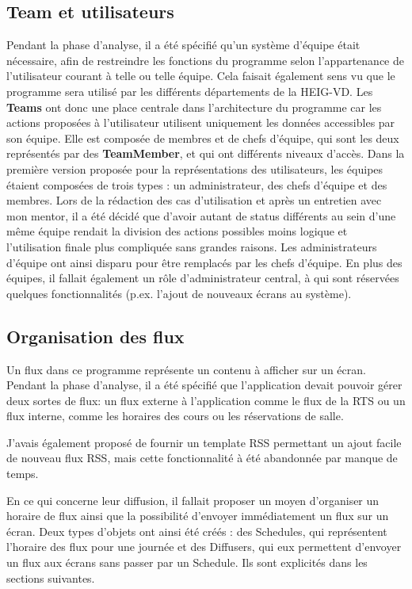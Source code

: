 \documentclass[french]{article}
\begin{document}
\subsection{Team et utilisateurs}
Pendant la phase d'analyse, il a été spécifié qu'un système d'équipe était nécessaire, afin de restreindre les fonctions du programme selon l'appartenance de l'utilisateur courant à telle ou telle équipe. Cela faisait également sens vu que le programme sera utilisé par les différents départements de la HEIG-VD.\newline
Les \textbf{Teams} ont donc une place centrale dans l'architecture du programme car les actions proposées à l'utilisateur utilisent uniquement les données accessibles par son équipe. Elle est composée de membres et de chefs d'équipe, qui sont les deux représentés par des \textbf{TeamMember}, et qui ont différents niveaux d'accès. \newline
Dans la première version proposée pour la représentations des utilisateurs, les équipes étaient composées de trois types : un administrateur, des chefs d'équipe et des membres. Lors de la rédaction des cas d'utilisation et après un entretien avec mon mentor, il a été décidé que d'avoir autant de status différents au sein d'une même équipe rendait la division des actions possibles moins logique et l'utilisation finale plus compliquée sans grandes raisons. Les administrateurs d'équipe ont ainsi disparu pour être remplacés par les chefs d'équipe.\newline
En plus des équipes, il fallait également un rôle d'administrateur central, à qui sont réservées quelques fonctionnalités (p.ex. l'ajout de nouveaux écrans au système).

\subsection{Organisation des flux}

Un flux dans ce programme représente un contenu à afficher sur un écran. Pendant la phase d'analyse, il a été spécifié que l'application devait pouvoir gérer deux sortes de flux: un flux externe à l'application comme le flux de la RTS ou un flux interne, comme les horaires des cours ou les réservations de salle. \newline

J'avais également proposé de fournir un template RSS permettant un ajout facile de nouveau flux RSS, mais cette fonctionnalité à été abandonnée par manque de temps.

En ce qui concerne leur diffusion, il fallait proposer un moyen d'organiser un horaire de flux ainsi que la possibilité d'envoyer immédiatement un flux sur un écran. Deux types d'objets ont ainsi été créés : des Schedules, qui représentent l'horaire des flux pour une journée et des Diffusers, qui eux permettent d'envoyer un flux aux écrans sans passer par un Schedule. Ils sont explicités dans les sections suivantes.
\end{document}
